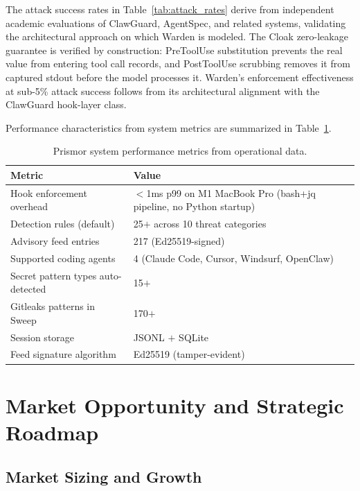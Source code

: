 \documentclass[11pt,letterpaper]{article}
\begin{document}
The attack success rates in Table~\ref{tab:attack_rates} derive from independent academic
evaluations of ClawGuard, AgentSpec, and related systems, validating the architectural
approach on which Warden is modeled. The Cloak zero-leakage guarantee is verified by
construction: PreToolUse substitution prevents the real value from entering tool call
records, and PostToolUse scrubbing removes it from captured stdout before the model
processes it. Warden's enforcement effectiveness at sub-5\% attack success follows from
its architectural alignment with the ClawGuard hook-layer class.

Performance characteristics from system metrics are summarized in
Table~\ref{tab:system_metrics}.

\begin{table}[ht]
\centering
\small
\caption{Prismor system performance metrics from operational data.}
\label{tab:system_metrics}
\begin{tabular}{@{}ll@{}}
\toprule
\textbf{Metric} & \textbf{Value} \\
\midrule
Hook enforcement overhead & $<$1ms p99 on M1 MacBook Pro (bash+jq pipeline, no Python startup) \\
Detection rules (default) & 25$+$ across 10 threat categories \\
Advisory feed entries & 217 (Ed25519-signed) \\
Supported coding agents & 4 (Claude Code, Cursor, Windsurf, OpenClaw) \\
Secret pattern types auto-detected & 15$+$ \\
Gitleaks patterns in Sweep & 170$+$ \\
Session storage & JSONL $+$ SQLite \\
Feed signature algorithm & Ed25519 (tamper-evident) \\
\bottomrule
\end{tabular}
\end{table}

\section{Market Opportunity and Strategic Roadmap}

\subsection{Market Sizing and Growth}
\end{document}
